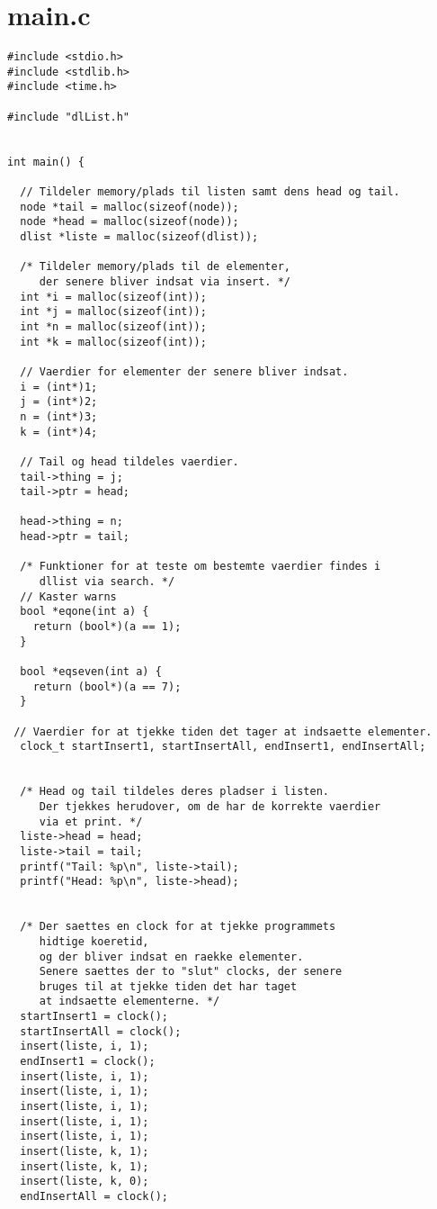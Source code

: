 \documentclass[a4paper,12pt]{article}
\begin{document}
\section*{main.c}
\begin{lstlisting}
#include <stdio.h>
#include <stdlib.h>
#include <time.h>

#include "dlList.h"


int main() {

  // Tildeler memory/plads til listen samt dens head og tail.
  node *tail = malloc(sizeof(node));
  node *head = malloc(sizeof(node));
  dlist *liste = malloc(sizeof(dlist));

  /* Tildeler memory/plads til de elementer, 
     der senere bliver indsat via insert. */
  int *i = malloc(sizeof(int));
  int *j = malloc(sizeof(int));
  int *n = malloc(sizeof(int));
  int *k = malloc(sizeof(int));

  // Vaerdier for elementer der senere bliver indsat.
  i = (int*)1;
  j = (int*)2;
  n = (int*)3;
  k = (int*)4;

  // Tail og head tildeles vaerdier.
  tail->thing = j;
  tail->ptr = head;

  head->thing = n;
  head->ptr = tail;

  /* Funktioner for at teste om bestemte vaerdier findes i 
     dllist via search. */
  // Kaster warns
  bool *eqone(int a) {
    return (bool*)(a == 1);
  }

  bool *eqseven(int a) {
    return (bool*)(a == 7);
  }

 // Vaerdier for at tjekke tiden det tager at indsaette elementer.
  clock_t startInsert1, startInsertAll, endInsert1, endInsertAll;


  /* Head og tail tildeles deres pladser i listen.
     Der tjekkes herudover, om de har de korrekte vaerdier 
     via et print. */
  liste->head = head;
  liste->tail = tail;
  printf("Tail: %p\n", liste->tail);
  printf("Head: %p\n", liste->head);


  /* Der saettes en clock for at tjekke programmets 
     hidtige koeretid,
     og der bliver indsat en raekke elementer.
     Senere saettes der to "slut" clocks, der senere 
     bruges til at tjekke tiden det har taget
     at indsaette elementerne. */
  startInsert1 = clock();
  startInsertAll = clock();
  insert(liste, i, 1);
  endInsert1 = clock();
  insert(liste, i, 1);
  insert(liste, i, 1);
  insert(liste, i, 1);
  insert(liste, i, 1);
  insert(liste, i, 1);
  insert(liste, k, 1);
  insert(liste, k, 1);
  insert(liste, k, 0);
  endInsertAll = clock();



\end{lstlisting}
\end{document}
